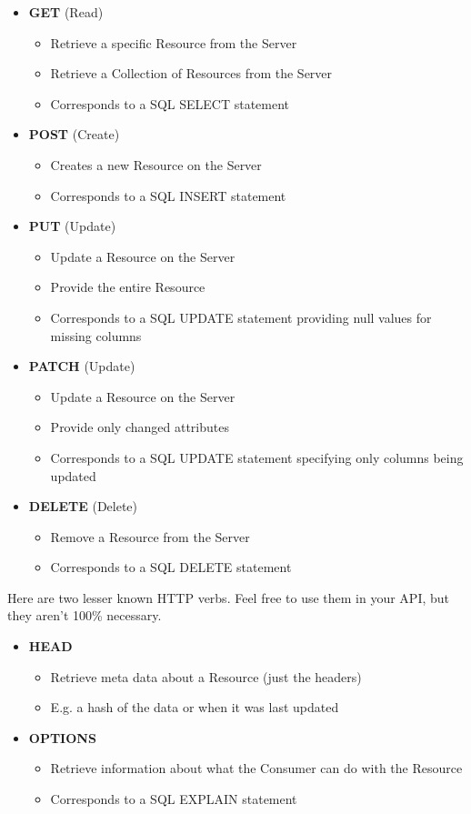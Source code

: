 \documentclass{book}
\begin{document}
\begin{itemize}
\item \textbf{GET} (Read)
    \begin{itemize}
    \item Retrieve a specific Resource from the Server
    \item Retrieve a Collection of Resources from the Server
    \item Corresponds to a SQL SELECT statement
    \end{itemize}
\item \textbf{POST} (Create)
    \begin{itemize}
    \item Creates a new Resource on the Server
    \item Corresponds to a SQL INSERT statement
    \end{itemize}
\item \textbf{PUT} (Update)
    \begin{itemize}
    \item Update a Resource on the Server
    \item Provide the entire Resource
    \item Corresponds to a SQL UPDATE statement providing null values for missing columns
    \end{itemize}
\item \textbf{PATCH} (Update)
    \begin{itemize}
    \item Update a Resource on the Server
    \item Provide only changed attributes
    \item Corresponds to a SQL UPDATE statement specifying only columns being updated
    \end{itemize}
\item \textbf{DELETE} (Delete)
    \begin{itemize}
    \item Remove a Resource from the Server
    \item Corresponds to a SQL DELETE statement
    \end{itemize}
\end{itemize}

Here are two lesser known HTTP verbs. Feel free to use them in your API, but they aren't 100\% necessary.

\begin{itemize}
\item \textbf{HEAD}
    \begin{itemize}
    \item Retrieve meta data about a Resource (just the headers)
    \item E.g. a hash of the data or when it was last updated
    \end{itemize}
\item \textbf{OPTIONS}
    \begin{itemize}
    \item Retrieve information about what the Consumer can do with the Resource
    \item Corresponds to a SQL EXPLAIN statement
    \end{itemize}
\end{itemize}
\end{document}
